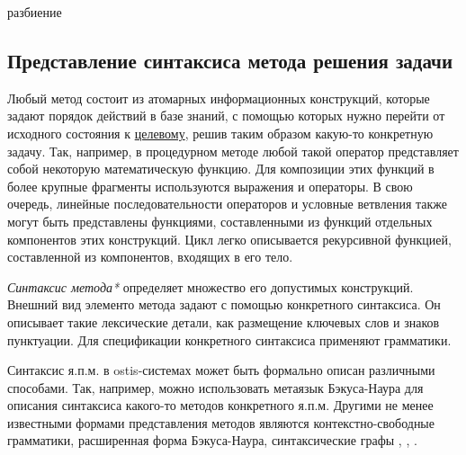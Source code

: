 \begin{SCn}
\begin{scnrelfromset}{разбиение}
    \begin{scnindent}
    \end{scnindent}
    \begin{scnindent}
    \end{scnindent}
\end{scnrelfromset}
\end{SCn}

\subsection{Представление синтаксиса метода решения задачи}
\label{sec_programs_method_syntax}

Любый метод состоит из атомарных информационных конструкций, которые задают порядок действий в базе знаний, с помощью которых нужно перейти от исходного состояния к \underline{целевому}, решив таким образом какую-то конкретную задачу. Так, например, в процедурном методе любой такой оператор представляет собой некоторую математическую функцию. Для композиции этих функций в более крупные фрагменты используются выражения и операторы. В свою очередь, линейные последовательности операторов и условные ветвления также могут быть представлены функциями, составленными из функций отдельных компонентов этих конструкций. Цикл легко описывается рекурсивной функцией, составленной из компонентов, входящих в его тело.

\textit{Синтаксис метода*} определяет множество его допустимых конструкций. Внешний вид элементо метода задают с помощью конкретного синтаксиса. Он описывает такие лексические детали, как размещение ключевых слов и знаков пунктуации. Для спецификации конкретного синтаксиса применяют грамматики.

Синтаксис я.п.м. в ostis-системах может быть формально описан различными способами. Так, например, можно использовать метаязык Бэкуса-Наура для описания синтаксиса какого-то методов конкретного я.п.м. Другими не менее известными формами представления методов являются контекстно-свободные грамматики, расширенная форма Бэкуса-Наура, синтаксические графы \cite{Sebesta2012}, \cite{Scott2006}, \cite{Scott1972}.

